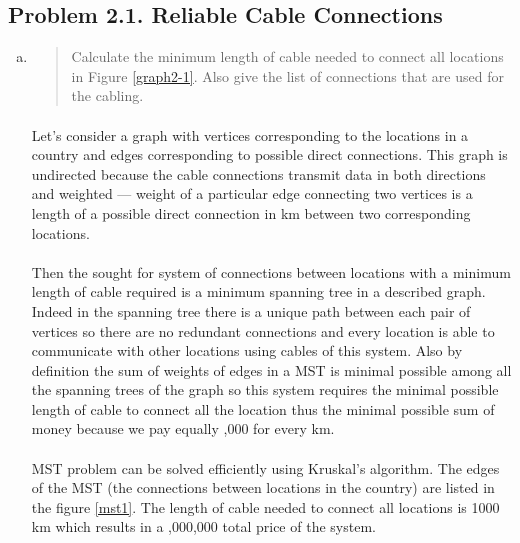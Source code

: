 \subsection{Problem 2.1. Reliable Cable Connections}
\begin{enumerate}[(a)]
\item \begin{quote}Calculate the minimum length of cable needed to connect all locations in Figure
\ref{graph2-1}. Also give the list of connections that are used for the cabling.\end{quote}

\paragraph{}
	Let's consider a graph with vertices corresponding to the locations in a country and edges corresponding to possible direct connections. This graph is undirected because the cable connections transmit data in both directions and weighted --- weight of a particular edge connecting two vertices is a length of a possible direct connection in km between two corresponding locations.

\paragraph{}
	Then the sought for system of connections between locations with a minimum length of cable required is a minimum spanning tree in a described graph. Indeed in the spanning tree there is a unique path between each pair of vertices so there are no redundant connections and every location is able to communicate with other locations using cables of this system. Also by definition the sum of weights of edges in a MST is minimal possible among all the spanning trees of the graph so this system requires the minimal possible length of cable to connect all the location thus the minimal possible sum of money because we pay equally ,000 for every km.

\paragraph{}
	MST problem can be solved efficiently using Kruskal's algorithm. The edges of the MST (the connections between locations in the country) are listed in the figure \ref{mst1}. The length of cable needed to connect all locations is 1000 km which results in a ,000,000 total price of the system.


\end{enumerate}
